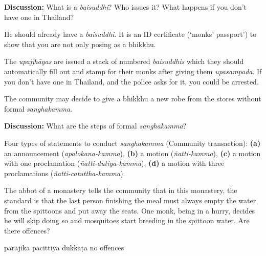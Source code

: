 \begin{exam}{\autoExamName}
\begin{problem*}
\begin{parts}
    \bigskip

    \textbf{Discussion:} What is a \emph{baisuddhi}? Who issues it? What happens if you don't have one in Thailand?

    \begin{solution}
      He should already have a \emph{baisuddhi}. It is an ID certificate
      (`monks' passport') to show that you are not only posing as a bhikkhu.

      The \emph{upajjhāyas} are issued a stack of numbered \emph{baisuddhis}
      which they should automatically fill out and stamp for their monks after
      giving them \emph{upasampada}. If you don't have one in Thailand, and the
      police asks for it, you could be arrested.
    \end{solution}

  \item {} The community may decide to give a bhikkhu a new robe from the stores without formal \emph{sanghakamma}. 

    \bigskip

    \textbf{Discussion:} What are the steps of formal \emph{sanghakamma}?

  \begin{solution}
    Four types of statements to conduct \emph{sanghakamma} (Community transaction):
    \textbf{(a)} an announcement (\emph{apalokana-kamma}),
    \textbf{(b)} a motion (\emph{ñatti-kamma}),
    \textbf{(c)} a motion with one proclamation (\emph{ñatti-dutiya-kamma}),
    \textbf{(d)} a motion with three proclamations (\emph{ñatti-catuttha-kamma}).
  \end{solution}

  \end{parts}

\end{problem*}

\problemDivide

\begin{problem}

  The abbot of a monastery tells the community that in this monastery, the
  standard is that the last person finishing the meal must always empty the
  water from the spittoons and put away the seats. One monk, being in a hurry,
  decides he will skip doing so and mosquitoes start breeding in the spittoon water. Are there
  offences?

  \bigskip

  \begin{answers}{4}
    \bChoices
     pārājika\eAns
     pācittiya\eAns
     dukkaṭa\eAns
     no offences\eAns
    \eChoices
  \end{answers}


\end{problem}
\end{exam}
